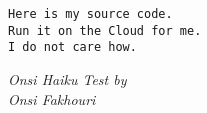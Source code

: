 \documentclass[../thesis.tex]{subfiles}
\begin{document}
    \cleardoublepage
    \thispagestyle{empty}
    \vspace*{3cm}

    \epigraph{\texttt{Here is my source code. \\ Run it on the Cloud for me. \\ I do not care how.}}{\textit{Onsi Haiku Test by \\ Onsi Fakhouri}}
\end{document}

